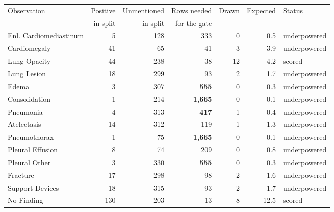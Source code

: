 \begingroup
\setlength{\tabcolsep}{5pt}
\begin{tabular}{lrrrrrl}
\toprule
Observation & Positive & Unmentioned & Rows needed & Drawn & Expected & Status \\
& in split & in split & for the gate & & & \\
\midrule
Enl. Cardiomediastinum & 5 & 128 &   333 & 0 & 0.5 & underpowered \\
Cardiomegaly & 41 & 65 &    41 & 3 & 3.9 & underpowered \\
Lung Opacity & 44 & 238 &    38 & 12 & 4.2 & scored \\
Lung Lesion & 18 & 299 &    93 & 2 & 1.7 & underpowered \\
Edema & 3 & 307 & \textbf{  555} & 0 & 0.3 & underpowered \\
Consolidation & 1 & 214 & \textbf{1,665} & 0 & 0.1 & underpowered \\
Pneumonia & 4 & 313 & \textbf{  417} & 1 & 0.4 & underpowered \\
Atelectasis & 14 & 312 &   119 & 1 & 1.3 & underpowered \\
Pneumothorax & 1 & 75 & \textbf{1,665} & 0 & 0.1 & underpowered \\
Pleural Effusion & 8 & 74 &   209 & 0 & 0.8 & underpowered \\
Pleural Other & 3 & 330 & \textbf{  555} & 0 & 0.3 & underpowered \\
Fracture & 17 & 298 &    98 & 2 & 1.6 & underpowered \\
Support Devices & 18 & 315 &    93 & 2 & 1.7 & underpowered \\
No Finding & 130 & 203 &    13 & 8 & 12.5 & scored \\
\bottomrule
\end{tabular}
\endgroup
